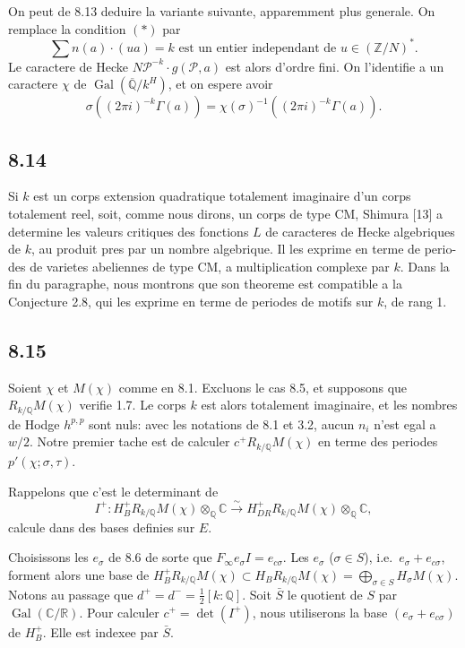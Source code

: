 \documentclass[12pt,a4paper]{article}
\theoremstyle{plain}
\theoremstyle{definition}
\theoremstyle{remark}
\DeclareMathOperator{\Gal}{Gal}
\newcommand{\Q}{\mathbb{Q}}
\newcommand{\R}{\mathbb{R}}
\newcommand{\C}{\mathbb{C}}
\newcommand{\Z}{\mathbb{Z}}
\begin{document}
On peut de 8.13 deduire la variante suivante, apparemment plus generale. On
remplace la condition $(*)$ par
\begin{equation}\label{eq:starprime}
\sum n(a) \cdot (ua) = k \text{ est un entier independant de } u \in (\Z/N)^*.\tag{$*'$}
\end{equation}
Le caractere de Hecke $N\mathcal{P}^{-k} \cdot g(\mathcal{P}, a)$ est alors d'ordre fini. On l'identifie a un
caractere $\chi$ de $\Gal(\overline{\Q}/k^H)$, et on espere avoir
\[
\sigma((2\pi i)^{-k} \Gamma(a)) = \chi(\sigma)^{-1} ((2\pi i)^{-k} \Gamma(a)).
\]

\subsection*{8.14}

Si $k$ est un corps extension quadratique totalement imaginaire d'un corps
totalement reel, soit, comme nous dirons, un corps de type CM, Shimura [13] a
determine les valeurs critiques des fonctions $L$ de caracteres de Hecke algebriques
 de $k$, au produit pres par un nombre algebrique. Il les exprime en terme de perio-
des de varietes abeliennes de type CM, a multiplication complexe par $k$. Dans la
fin du paragraphe, nous montrons que son theoreme est compatible a la Conjecture
2.8, qui les exprime en terme de periodes de motifs sur $k$, de rang 1.

\subsection*{8.15}

Soient $\chi$ et $M(\chi)$ comme en 8.1. Excluons le cas 8.5, et supposons que
$R_{k/\Q} M(\chi)$ verifie 1.7. Le corps $k$ est alors totalement imaginaire, et les nombres
de Hodge $h^{p,p}$ sont nuls: avec les notations de 8.1 et 3.2, aucun $n_i$ n'est egal a $w/2$.
Notre premier tache est de calculer $c^+ R_{k/\Q} M(\chi)$ en terme des periodes
$p'(\chi; \sigma, \tau)$.

Rappelons que c'est le determinant de
\[
I^+: H_B^+ R_{k/\Q} M(\chi) \otimes_\Q \C \xrightarrow{\sim} H_{DR}^+ R_{k/\Q} M(\chi) \otimes_\Q \C,
\]
calcule dans des bases definies sur $E$.

Choisissons les $e_\sigma$ de 8.6 de sorte que $F_\infty e_\sigma I = e_{c\sigma}$. Les $e_\sigma$
($\sigma \in S$), i.e.~$e_\sigma + e_{c\sigma}$, forment alors une base de $H_B^+ R_{k/\Q} M(\chi) \subset
H_B R_{k/\Q} M(\chi) = \bigoplus_{\sigma \in S} H_\sigma M(\chi)$. Notons au passage que
$d^+ = d^- = \tfrac{1}{2}[k:\Q]$. Soit $\bar{S}$ le quotient de $S$ par $\Gal(\C/\R)$. Pour calculer
$c^+ = \det(I^+)$, nous utiliserons la base $(e_\sigma + e_{c\sigma})$ de $H_B^+$. Elle est indexee
par $\bar{S}$.
\end{document}
